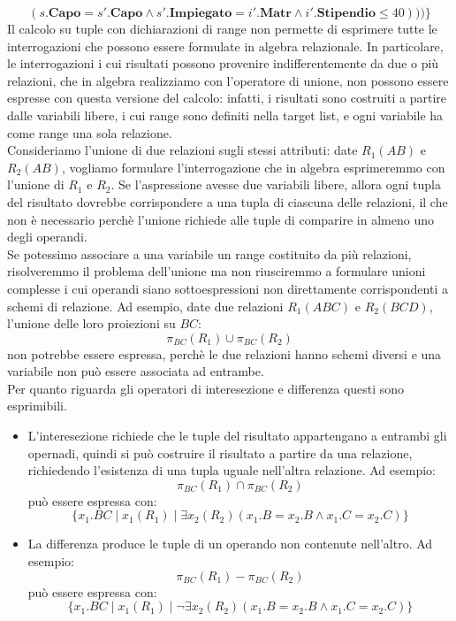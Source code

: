 \documentclass[12pt]{report}
\begin{document}
  	\[
  	(s.\textbf{Capo} = s'.\textbf{Capo} \wedge s'.\textbf{Impiegato} = i'.\textbf{Matr} \wedge i'.\textbf{Stipendio} \leq 40)))\}
  	\]
  	Il calcolo su tuple con dichiarazioni di range non permette di esprimere tutte le interrogazioni che possono essere formulate in algebra relazionale. In particolare, le interrogazioni i cui risultati possono provenire indifferentemente da due o più relazioni, che in algebra realizziamo con l'operatore di unione, non possono essere espresse con questa versione del calcolo: infatti, i risultati sono costruiti a partire dalle variabili libere, i cui range sono definiti nella target list, e ogni variabile ha come range una sola relazione. \\
  	Consideriamo l'unione di due relazioni sugli stessi attributi: date $R_1(AB)$ e $R_2(AB)$, vogliamo formulare l'interrogazione che in algebra esprimeremmo con l'unione di $R_1$ e $R_2$. Se l'aspressione avesse due variabili libere, allora ogni tupla del risultato dovrebbe corrispondere a una tupla di ciascuna delle relazioni, il che non è necessario perchè l'unione richiede alle tuple di comparire in almeno uno degli operandi.  \\
  	Se potessimo associare a una variabile un range costituito da più relazioni, risolveremmo il problema dell'unione ma non riusciremmo a formulare unioni complesse i cui operandi siano sottoespressioni non direttamente corrispondenti a schemi di relazione. Ad esempio, date due relazioni $R_1(ABC)$ e $R_2(BCD)$, l'unione delle loro proiezioni su $BC$:
  	\[
  	\pi_{BC}(R_1) \cup \pi_{BC}(R_2)
  	\]
  	non potrebbe essere espressa, perchè le due relazioni hanno schemi diversi e una variabile non può essere associata ad entrambe. \\
  	Per quanto riguarda gli operatori di interesezione e differenza questi sono esprimibili.
  	\begin{itemize}
  		\item L'interesezione richiede che le tuple del risultato appartengano a entrambi gli opernadi, quindi si può costruire il risultato a partire da una relazione, richiedendo l'esistenza di una tupla uguale nell'altra relazione. Ad esempio:
  		\[
  		\pi_{BC}(R_1) \cap \pi_{BC}(R_2)
  		\]
  		può essere espressa con:
  		\[
  		\{x_1.BC \mid x_1(R_1) \mid \exists x_2(R_2)(x_1.B = x_2.B \wedge x_1.C = x_2.C)\}
  		\]
  		\item La differenza produce le tuple di un operando non contenute nell'altro. Ad esempio:
  		\[
  		\pi_{BC}(R_1) - \pi_{BC}(R_2)
   		\]
   		può essere espressa con:
   		\[
   		\{x_1.BC \mid x_1(R_1) \mid \neg\exists x_2(R_2)(x_1.B = x_2.B \wedge x_1.C = x_2.C)\}
   		\]
  	\end{itemize}
\end{document}
